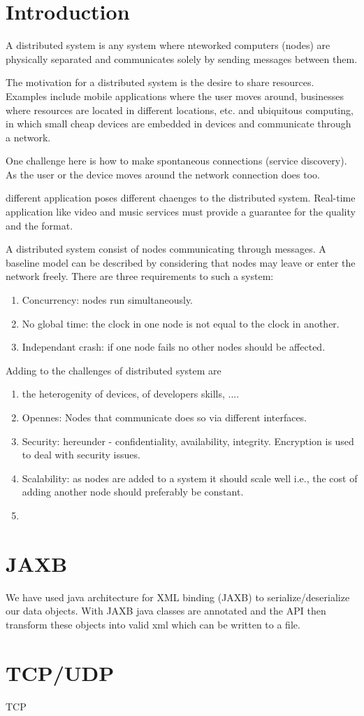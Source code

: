 \section{Introduction}

A distributed system is any system where nteworked computers (nodes) are physically separated 
and communicates solely by sending messages between them. 

The motivation for a distributed system is the desire to share resources. Examples include 
mobile applications where the user moves around, businesses where resources are located in different locations, 
etc. and ubiquitous computing, in which small cheap devices are embedded in devices and communicate through a network. 

One challenge here is how to make spontaneous connections (service discovery). As the user or the device moves around the network connection does too.

different application poses different chaenges to the distributed system. Real-time application like video and music services must provide a guarantee for the quality and the format. 

A distributed system consist of nodes communicating through messages. A baseline model can be described by 
considering that nodes may leave or enter the network freely. There are three requirements to such a system:

\begin{enumerate}
\item Concurrency: nodes run simultaneously.
\item No global time: the clock in one node is not equal to the clock in another.
\item Independant crash: if one node fails no other nodes should be affected. 
\end{enumerate}

Adding to the challenges of distributed system are 


\begin{enumerate}
\item the heterogenity of devices, of developers skills, .... 	
\item Opennes: Nodes that communicate does so via different interfaces. 
\item Security: hereunder - confidentiality, availability, integrity. Encryption is used to deal with security issues.
\item Scalability: as nodes are added to a system it should scale well i.e., the cost of adding another node should preferably be constant.
\item  
\end{enumerate}

\section{JAXB}

We have used java architecture for XML binding (JAXB) to serialize/deserialize our data objects. 
With JAXB java classes are annotated and the API then transform these objects into valid xml which
can be written to a file.

\section{TCP/UDP}  

TCP 
